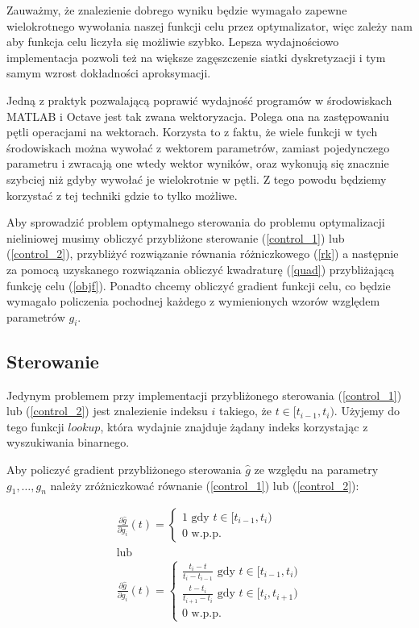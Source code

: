 \documentclass[11pt]{article}
\begin{document}
Zauważmy, że znalezienie dobrego wyniku będzie wymagało zapewne wielokrotnego wywołania naszej funkcji celu przez optymalizator, więc zależy nam aby funkcja celu liczyła się możliwie szybko. Lepsza wydajnościowo implementacja pozwoli też na większe zagęszczenie siatki dyskretyzacji i tym samym wzrost dokładności aproksymacji.

Jedną z praktyk pozwalającą poprawić wydajność programów w środowiskach MATLAB i Octave jest tak zwana wektoryzacja. Polega ona na zastępowaniu pętli operacjami na wektorach. Korzysta to z faktu, że wiele funkcji w tych środowiskach można wywołać z wektorem parametrów, zamiast pojedynczego parametru i zwracają one wtedy wektor wyników, oraz wykonują się znacznie szybciej niż gdyby wywołać je wielokrotnie w pętli. Z tego powodu będziemy korzystać z tej techniki gdzie to tylko możliwe.

Aby sprowadzić problem optymalnego sterowania do problemu optymalizacji nieliniowej musimy obliczyć przybliżone sterowanie (\ref{control_1}) lub (\ref{control_2}), przybliżyć rozwiązanie równania różniczkowego (\ref{rk}) a następnie za pomocą uzyskanego rozwiązania obliczyć kwadraturę (\ref{quad}) przybliżającą funkcję celu (\ref{objf}). Ponadto chcemy obliczyć gradient funkcji celu, co będzie wymagało policzenia pochodnej każdego z wymienionych wzorów względem parametrów $g_i$.

\subsection{Sterowanie}
Jedynym problemem przy implementacji przybliżonego sterowania (\ref{control_1}) lub (\ref{control_2}) jest znalezienie indeksu $i$ takiego, że $t \in [t_{i-1}, t_i)$. Użyjemy do tego funkcji $lookup$, która wydajnie znajduje żądany indeks korzystając z wyszukiwania binarnego.

Aby policzyć gradient przybliżonego sterowania $\hat{g}$ ze względu na parametry $g_1,\ldots,g_n$ należy zróżniczkować równanie (\ref{control_1}) lub (\ref{control_2}):

\begin{gather}
  \frac{\partial \hat{g}}{\partial g_i}(t) = \begin{cases} 1 \text{ gdy } t \in [t_{i-1}, t_i) \\ 0 \text{ w.p.p.} \end{cases} \label{dcontrol_1}\\
  \nonumber \text{lub}\\
  \frac{\partial \hat{g}}{\partial g_i}(t) = \begin{cases} \frac{t_i - t}{t_i - t_{i-1}} \text{ gdy } t \in [t_{i-1}, t_i) \\ \frac{t - t_i}{t_{i+1} - t_i} \text{ gdy } t \in [t_{i}, t_{i+1}) \\ 0 \text{ w.p.p.} \end{cases} \label{dcontrol_2}
\end{gather}
\end{document}
